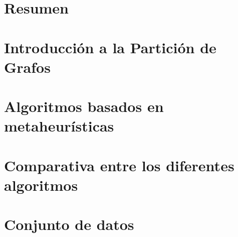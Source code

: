 \documentclass[a4paper,10pt,twoside]{report}
\author{\me}
\begin{document}


\normalsize

\chapter*{Resumen}\label{chapter:Resumen}
\setcounter{page}{0}


\tableofcontents

\chapter{Introducción a la Partición de Grafos}\label{chapter:Introducción}


\chapter{Algoritmos basados en metaheurísticas}\label{chapter:Algoritmos}


%

%

\chapter{Comparativa entre los diferentes algoritmos}\label{chapter:Comparativa}


\chapter{Conjunto de datos}\label{chapter:Datos}


\renewcommand{\bibname}{Bibliografia}


\end{document}
